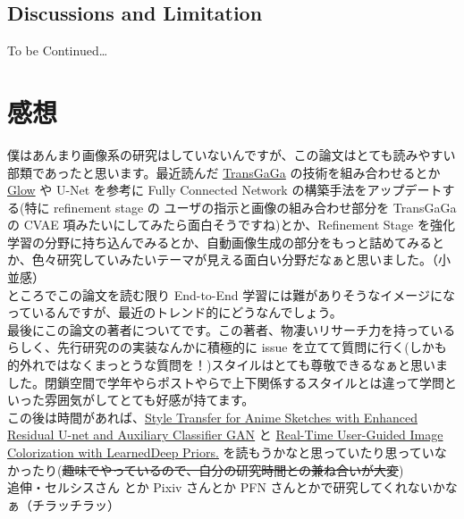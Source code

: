\documentclass[a4paper, dvipdfmx, 10pt]{article}
\begin{document}
\subsection{Discussions and Limitation}
\label{sec:orgfc35280}
To be Continued\ldots{}\\

\section{感想}
\label{sec:orge1eabfc}
僕はあんまり画像系の研究はしていないんですが、この論文はとても読みやすい部類であったと思います。最近読んだ \href{https://arxiv.org/abs/1904.09571}{TransGaGa} の技術を組み合わせるとか \href{https://arxiv.org/abs/1807.03039}{Glow} や U-Net を参考に Fully Connected Network の構築手法をアップデートする(特に refinement stage の ユーザの指示と画像の組み合わせ部分を TransGaGa の CVAE 項みたいにしてみたら面白そうですね)とか、Refinement Stage を強化学習の分野に持ち込んでみるとか、自動画像生成の部分をもっと詰めてみるとか、色々研究していみたいテーマが見える面白い分野だなぁと思いました。（小並感）\\

ところでこの論文を読む限り End-to-End 学習には難がありそうなイメージになっているんですが、最近のトレンド的にどうなんでしょう。\\

最後にこの論文の著者についてです。この著者、物凄いリサーチ力を持っているらしく、先行研究のの実装なんかに積極的に issue を立てて質問に行く(しかも的外れではなくまっとうな質問を！)スタイルはとても尊敬できるなぁと思いました。閉鎖空間で学年やらポストやらで上下関係するスタイルとは違って学問といった雰囲気がしてとても好感が持てます。\\

この後は時間があれば、\href{https://arxiv.org/pdf/1706.03319.pdf}{Style Transfer for Anime Sketches with Enhanced Residual U-net and Auxiliary Classifier GAN} と \href{https://arxiv.org/pdf/1705.02999.pdf}{Real-Time User-Guided Image Colorization with LearnedDeep Priors.} を読もうかなと思っていたり思っていなかったり(\sout{趣味でやっているので、自分の研究時間との兼ね合いが大変})\\

追伸・セルシスさん とか Pixiv さんとか PFN さんとかで研究してくれないかなぁ（チラッチラッ）\\
\end{document}
